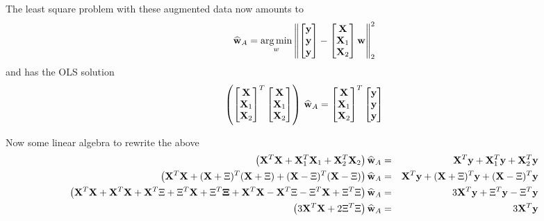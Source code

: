 The least square problem with these augmented data now amounts to
\begin{equation}\label{eq:AugProblem}
\mathbf{\widehat{w}}_A = \operatorname*{arg\,min}_w \left\Vert
\begin{bmatrix}
\mathbf{y}\\
\mathbf{y}\\
\mathbf{y}
\end{bmatrix} -
\begin{bmatrix}
\mathbf{X} \\
\mathbf{X}_1\\
\mathbf{X}_2
\end{bmatrix}
\mathbf{w} \right\Vert_2^2
\end{equation}
and has the OLS solution
\begin{equation}
\left( \begin{bmatrix}
\mathbf{X} \\
\mathbf{X}_1\\
\mathbf{X}_2
\end{bmatrix}^T \begin{bmatrix}
\mathbf{X} \\
\mathbf{X}_1\\
\mathbf{X}_2
\end{bmatrix} \right) \, \mathbf{\widehat{w}}_A =  \begin{bmatrix}
\mathbf{X} \\
\mathbf{X}_1\\
\mathbf{X}_2
\end{bmatrix}^T \begin{bmatrix}
\mathbf{y}\\
\mathbf{y}\\
\mathbf{y}
\end{bmatrix}
\end{equation}

Now some linear algebra to rewrite the above
\begin{eqnarray}\label{eq:AugSolutoin}
\big( \mathbf{X}^T\mathbf{X} + \mathbf{X}_1^T\mathbf{X}_1 +\mathbf{X}_2^T\mathbf{X}_2 \big) \, \mathbf{\widehat{w}}_A & = &
\mathbf{X}^T\mathbf{y} + \mathbf{X}_1^T\mathbf{y} +\mathbf{X}_2^T\mathbf{y} \nonumber \\
\big( \mathbf{X}^T\mathbf{X} + (\mathbf{X} + \Xi)^T(\mathbf{X} + \Xi) +(\mathbf{X} - \Xi)^T(\mathbf{X} - \Xi) \big) \, \mathbf{\widehat{w}}_A & = &
\mathbf{X}^T\mathbf{y} + (\mathbf{X} + \Xi)^T\mathbf{y} +(\mathbf{X}-\Xi)^T\mathbf{y} \nonumber \\
\big( \mathbf{X}^T\mathbf{X} + \mathbf{X}^T\mathbf{X} + \mathbf{X}^T\Xi + \Xi^T\mathbf{X} + \Xi^T\mathbf{\Xi} + \mathbf{X}^T\mathbf{X} - \mathbf{X}^T\Xi - \Xi^T\mathbf{X} + \Xi^T\Xi \big)
\, \mathbf{\widehat{w}}_A & = &
3 \mathbf{X}^T\mathbf{y} + \Xi^T\mathbf{y} - \Xi^T\mathbf{y} \nonumber \\
\big( 3 \mathbf{X}^T\mathbf{X} + 2 \Xi^T\Xi \big)
\, \mathbf{\widehat{w}}_A & = &
3 \mathbf{X}^T\mathbf{y}
\end{eqnarray}

